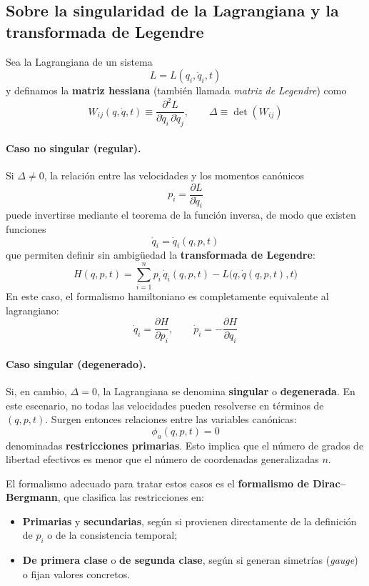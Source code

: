 \documentclass{article}
\begin{document}
\subsection{Sobre la singularidad de la Lagrangiana y la transformada de Legendre}

Sea la Lagrangiana de un sistema
\[
L = L(q_i, \dot{q}_i, t)
\]
y definamos la \textbf{matriz hessiana} (también llamada \emph{matriz de Legendre}) como
\[
W_{ij}(q,\dot q,t) \equiv \frac{\partial^2 L}{\partial \dot q_i\,\partial \dot q_j},
\qquad
\Delta \equiv \det(W_{ij})
\]

\paragraph{Caso no singular (regular).}
Si \(\Delta \neq 0\), la relación entre las velocidades y los momentos canónicos
\[
p_i = \frac{\partial L}{\partial \dot{q}_i}
\]
puede invertirse mediante el teorema de la función inversa, de modo que existen funciones
\[
\dot q_i = \dot q_i(q,p,t)
\]
que permiten definir sin ambigüedad la \textbf{transformada de Legendre}:
\[
H(q,p,t) = \sum_{i=1}^{n} p_i\,\dot q_i(q,p,t) - L\big(q,\dot q(q,p,t),t\big)
\]
En este caso, el formalismo hamiltoniano es completamente equivalente al lagrangiano:
\[
\boxed{
\dot q_i = \frac{\partial H}{\partial p_i},
\qquad
\dot p_i = -\frac{\partial H}{\partial q_i}
}
\]

\paragraph{Caso singular (degenerado).}
Si, en cambio, \(\Delta = 0\), la Lagrangiana se denomina \textbf{singular} o \textbf{degenerada}.
En este escenario, no todas las velocidades pueden resolverse en términos de \((q,p,t)\).
Surgen entonces relaciones entre las variables canónicas:
\[
\phi_a(q,p,t) = 0
\]
denominadas \textbf{restricciones primarias}.
Esto implica que el número de grados de libertad efectivos es menor que el número de coordenadas generalizadas \(n\).

El formalismo adecuado para tratar estos casos es el \textbf{formalismo de Dirac–Bergmann},
que clasifica las restricciones en:
\begin{itemize}
    \item \textbf{Primarias} y \textbf{secundarias}, según si provienen directamente de la definición de \(p_i\) o de la consistencia temporal;
    \item \textbf{De primera clase} o \textbf{de segunda clase}, según si generan simetrías (\emph{gauge}) o fijan valores concretos.
\end{itemize}
\end{document}
